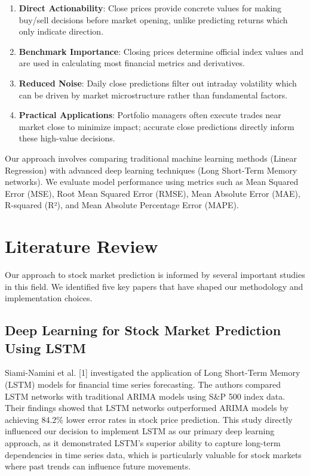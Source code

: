 \documentclass[sigconf]{acmart}
\begin{document}
\begin{enumerate}
\item \textbf{Direct Actionability}: Close prices provide concrete values for making buy/sell decisions before market opening, unlike predicting returns which only indicate direction.
\item \textbf{Benchmark Importance}: Closing prices determine official index values and are used in calculating most financial metrics and derivatives.
\item \textbf{Reduced Noise}: Daily close predictions filter out intraday volatility which can be driven by market microstructure rather than fundamental factors.
\item \textbf{Practical Applications}: Portfolio managers often execute trades near market close to minimize impact; accurate close predictions directly inform these high-value decisions.
\end{enumerate}

Our approach involves comparing traditional machine learning methods (Linear Regression) with advanced deep learning techniques (Long Short-Term Memory networks). We evaluate model performance using metrics such as Mean Squared Error (MSE), Root Mean Squared Error (RMSE), Mean Absolute Error (MAE), R-squared (R²), and Mean Absolute Percentage Error (MAPE).

\section{Literature Review}

Our approach to stock market prediction is informed by several important studies in this field. We identified five key papers that have shaped our methodology and implementation choices.

\subsection{Deep Learning for Stock Market Prediction Using LSTM}

Siami-Namini et al. [1] investigated the application of Long Short-Term Memory (LSTM) models for financial time series forecasting. The authors compared LSTM networks with traditional ARIMA models using S\&P 500 index data. Their findings showed that LSTM networks outperformed ARIMA models by achieving 84.2\% lower error rates in stock price prediction. This study directly influenced our decision to implement LSTM as our primary deep learning approach, as it demonstrated LSTM's superior ability to capture long-term dependencies in time series data, which is particularly valuable for stock markets where past trends can influence future movements.
\end{document}
